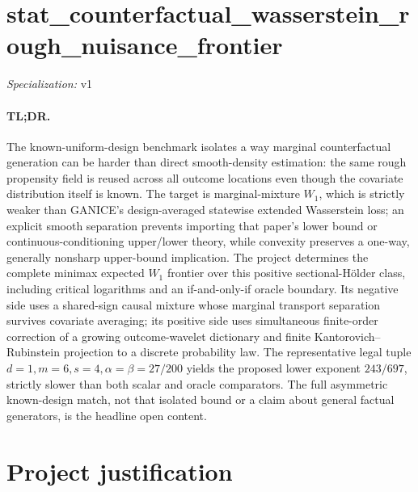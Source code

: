 \documentclass{article}
\begin{document}
\sloppy

\section*{stat\_\allowbreak{}counterfactual\_\allowbreak{}wasserstein\_\allowbreak{}rough\_\allowbreak{}nuisance\_\allowbreak{}frontier}

\noindent\textit{Specialization:} v1\par

\paragraph{TL;DR.} The known-uniform-design benchmark isolates a way marginal counterfactual generation can be harder than direct smooth-density estimation: the same rough propensity field is reused across all outcome locations even though the covariate distribution itself is known. The target is marginal-mixture \(W_1\), which is strictly weaker than GANICE's design-averaged statewise extended Wasserstein loss; an explicit smooth separation prevents importing that paper's lower bound or continuous-conditioning upper/lower theory, while convexity preserves a one-way, generally nonsharp upper-bound implication. The project determines the complete minimax expected \(W_1\) frontier over this positive sectional-Hölder class, including critical logarithms and an if-and-only-if oracle boundary. Its negative side uses a shared-sign causal mixture whose marginal transport separation survives covariate averaging; its positive side uses simultaneous finite-order correction of a growing outcome-wavelet dictionary and finite Kantorovich--Rubinstein projection to a discrete probability law. The representative legal tuple \(d=1,m=6,s=4,\alpha=\beta=27/200\) yields the proposed lower exponent \(243/697\), strictly slower than both scalar and oracle comparators. The full asymmetric known-design match, not that isolated bound or a claim about general factual generators, is the headline open content.

\section{Project justification}
\end{document}
